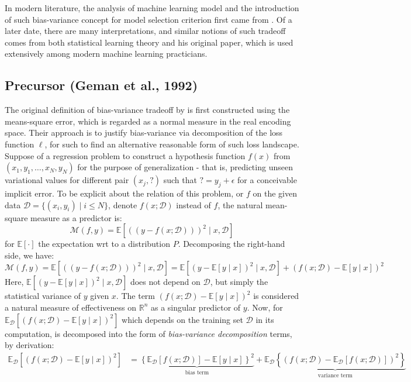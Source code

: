 \documentclass[10pt,oneside,oldfontcommands,dvipsnames,article]{memoir}
\begin{document}
In modern literature, the analysis of machine learning model and the introduction of such bias-variance concept for model selection criterion first came from \cite{6797087}. Of a later date, there are many interpretations, and similar notions of such tradeoff comes from both statistical learning theory and his original paper, which is used extensively among modern machine learning practicians. 
\subsection{Precursor (Geman et al., 1992)}

The original definition of bias-variance tradeoff by \cite{6797087} is first constructed using the means-square error, which is regarded as a normal measure in the real encoding space. Their approach is to justify bias-variance via decomposition of the loss function $\ell$, for such to find an alternative reasonable form of such loss landscape. Suppose of a regression problem to construct a hypothesis function $f(x)$ from $(x_{1},y_{1},\dots,x_{N},y_{N})$ for the purpose of generalization - that is, predicting unseen variational values for different pair $(x_{j}, \mathord{?})$ such that $\mathord{?}=y_{j}+\epsilon$ for a conceivable implicit error. To be explicit about the relation of this problem, or $f$ on the given data $\mathcal{D}=\{(x_i, y_i)\mid i \leq N\}$, denote $f(x;\mathcal{D})$ instead of $f$, the natural mean-square measure as a predictor is: 
\begin{equation}
    \mathcal{M}(f,y) = \mathbb{E} \left[((y-f(x;\mathcal{D})))^{2}\mid x, \mathcal{D}\right] 
\end{equation} for $\mathbb{E}[\cdot]$ the expectation wrt to a distribution $P$. Decomposing the right-hand side, we have: 
\begin{equation}
    \mathcal{M}(f,y) = \mathbb{E} \left[((y-f(x;\mathcal{D})))^{2}\mid x, \mathcal{D}\right] = \mathbb{E}\left[(y-\mathbb{E}[y\mid x])^{2}\mid x,\mathcal{D}\right] + (f(x;\mathcal{D})-\mathbb{E}[y\mid x])^{2}
\end{equation}
Here, $\mathbb{E}\left[(y-\mathbb{E}[y\mid x])^{2}\mid x,\mathcal{D}\right]$ does not depend on $\mathcal{D}$, but simply the statistical variance of $y$ given $x$. The term $(f(x;\mathcal{D})-\mathbb{E}[y\mid x])^{2}$ is considered a natural measure of effectiveness on $\mathbb{R}^{n}$ as a singular predictor of $y$. Now, for $\mathbb{E}_{\mathcal{D}}\left[(f(x;\mathcal{D})-\mathbb{E}[y\mid x])^{2}\right]$ which depends on the training set $\mathcal{D}$ in its computation, is decomposed into the form of \textit{bias-variance decomposition} terms, by derivation: 
\begin{equation}
    \begin{split}
        \mathbb{E}_{\mathcal{D}} \left[(f(x;\mathcal{D})-\mathbb{E}[y\mid x])^{2}\right] & = \underbrace{\left\{ \mathbb{E}_{\mathcal{D}}[f(x;\mathcal{D})] - \mathbb{E}[y\mid x] \right\}^{2}}_{\text{bias term}} + \underbrace{\mathbb{E}_{\mathcal{D}} \left\{(f(x;\mathcal{D})- \mathbb{E}_{\mathcal{D}}[f(x;\mathcal{D})])^{2}\right\}}_{\text{variance term}}
    \end{split}
\end{equation}
\end{document}
